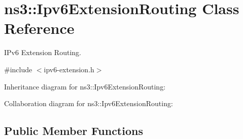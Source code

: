 \hypertarget{classns3_1_1Ipv6ExtensionRouting}{}\section{ns3\+:\+:Ipv6\+Extension\+Routing Class Reference}
\label{classns3_1_1Ipv6ExtensionRouting}


I\+Pv6 Extension Routing.  




{\ttfamily \#include $<$ipv6-\/extension.\+h$>$}



Inheritance diagram for ns3\+:\+:Ipv6\+Extension\+Routing\+:


Collaboration diagram for ns3\+:\+:Ipv6\+Extension\+Routing\+:
\subsection*{Public Member Functions}
